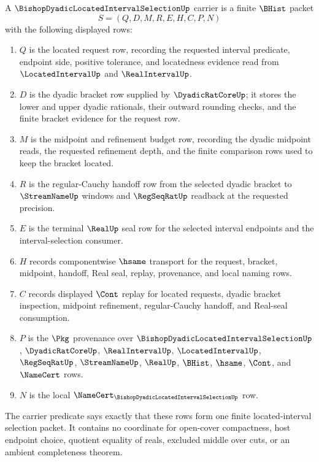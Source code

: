 \begin{definition}
\label{def:bishop-dyadic-located-interval-selection-carrier}
A $\BishopDyadicLocatedIntervalSelectionUp$ carrier is a finite $\BHist$ packet
$$
S=(Q,D,M,R,E,H,C,P,N)
$$
with the following displayed rows:
\begin{enumerate}
\item $Q$ is the located request row, recording the requested interval predicate, endpoint side, positive tolerance, and locatedness evidence read from $\LocatedIntervalUp$ and $\RealIntervalUp$.
\item $D$ is the dyadic bracket row supplied by $\DyadicRatCoreUp$; it stores the lower and upper dyadic rationals, their outward rounding checks, and the finite bracket evidence for the request row.
\item $M$ is the midpoint and refinement budget row, recording the dyadic midpoint reads, the requested refinement depth, and the finite comparison rows used to keep the bracket located.
\item $R$ is the regular-Cauchy handoff row from the selected dyadic bracket to $\StreamNameUp$ windows and $\RegSeqRatUp$ readback at the requested precision.
\item $E$ is the terminal $\RealUp$ seal row for the selected interval endpoints and the interval-selection consumer.
\item $H$ records componentwise $\hsame$ transport for the request, bracket, midpoint, handoff, Real seal, replay, provenance, and local naming rows.
\item $C$ records displayed $\Cont$ replay for located requests, dyadic bracket inspection, midpoint refinement, regular-Cauchy handoff, and Real-seal consumption.
\item $P$ is the $\Pkg$ provenance over $\BishopDyadicLocatedIntervalSelectionUp$, $\DyadicRatCoreUp$, $\RealIntervalUp$, $\LocatedIntervalUp$, $\RegSeqRatUp$, $\StreamNameUp$, $\RealUp$, $\BHist$, $\hsame$, $\Cont$, and $\NameCert$ rows.
\item $N$ is the local $\NameCert_{\BishopDyadicLocatedIntervalSelectionUp}$ row.
\end{enumerate}
The carrier predicate says exactly that these rows form one finite located-interval selection packet. It contains no coordinate for open-cover compactness, host endpoint choice, quotient equality of reals, excluded middle over cuts, or an ambient completeness theorem.
\end{definition}

